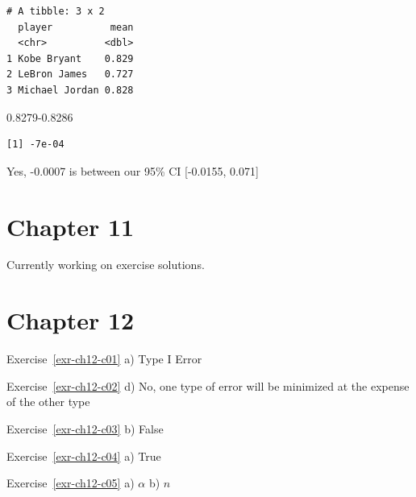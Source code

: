 \documentclass[
  letterpaper,
  DIV=11,
  numbers=noendperiod]{scrreprt}
\newenvironment{Shaded}{\begin{snugshade}}{\end{snugshade}}
\newcommand{\FloatTok}[1]{\textcolor[rgb]{0.68,0.00,0.00}{#1}}
\theoremstyle{definition}
\theoremstyle{remark}
\begin{document}
\begin{verbatim}
# A tibble: 3 x 2
  player          mean
  <chr>          <dbl>
1 Kobe Bryant    0.829
2 LeBron James   0.727
3 Michael Jordan 0.828
\end{verbatim}

\begin{Shaded}
\begin{Highlighting}[]
\FloatTok{0.8279{-}0.8286}
\end{Highlighting}
\end{Shaded}

\begin{verbatim}
[1] -7e-04
\end{verbatim}

Yes, -0.0007 is between our 95\% CI {[}-0.0155, 0.071{]}

\hypertarget{sec-ex11-sol}{%
\section{Chapter 11}\label{sec-ex11-sol}}

\begin{tcolorbox}[enhanced jigsaw, colback=white, toprule=.15mm, bottomrule=.15mm, titlerule=0mm, title=\textcolor{quarto-callout-caution-color}{\faFire}\hspace{0.5em}{Under Construction}, leftrule=.75mm, arc=.35mm, left=2mm, colframe=quarto-callout-caution-color-frame, coltitle=black, opacitybacktitle=0.6, bottomtitle=1mm, colbacktitle=quarto-callout-caution-color!10!white, opacityback=0, toptitle=1mm, rightrule=.15mm, breakable]

Currently working on exercise solutions.

\end{tcolorbox}

\hypertarget{sec-ex12-sol}{%
\section{Chapter 12}\label{sec-ex12-sol}}

Exercise~\ref{exr-ch12-c01} a) Type I Error

Exercise~\ref{exr-ch12-c02} d) No, one type of error will be minimized
at the expense of the other type

Exercise~\ref{exr-ch12-c03} b) False

Exercise~\ref{exr-ch12-c04} a) True

Exercise~\ref{exr-ch12-c05} a) \(\alpha\) b) \(n\)
\end{document}
